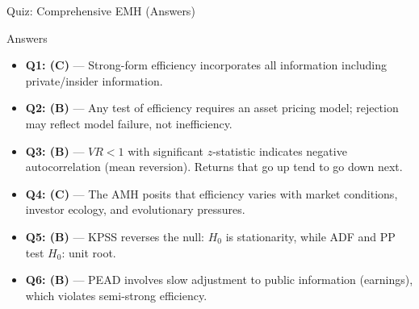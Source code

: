 \documentclass[9pt, aspectratio=169, t]{beamer}
\theoremstyle{definition}
\newenvironment{cminipage}[1]{%
    \par\noindent\hfill\begin{minipage}{#1}\ignorespaces
}{%
    \end{minipage}\hfill\null\par
}
\begin{document}
\begin{frame}{Quiz: Comprehensive EMH (Answers)}
\begin{cminipage}{0.95\textwidth}
\footnotesize
\begin{exampleblock}{Answers}
\begin{itemize}\setlength{\itemsep}{1pt}
    \item \textbf{Q1: (C)} --- Strong-form efficiency incorporates all information including private/insider information.
    \item \textbf{Q2: (B)} --- Any test of efficiency requires an asset pricing model; rejection may reflect model failure, not inefficiency.
    \item \textbf{Q3: (B)} --- $VR < 1$ with significant $z$-statistic indicates negative autocorrelation (mean reversion). Returns that go up tend to go down next.
    \item \textbf{Q4: (C)} --- The AMH posits that efficiency varies with market conditions, investor ecology, and evolutionary pressures.
    \item \textbf{Q5: (B)} --- KPSS reverses the null: $H_0$ is stationarity, while ADF and PP test $H_0$: unit root.
    \item \textbf{Q6: (B)} --- PEAD involves slow adjustment to public information (earnings), which violates semi-strong efficiency.
\end{itemize}
\end{exampleblock}
\end{cminipage}
\end{frame}
\end{document}
